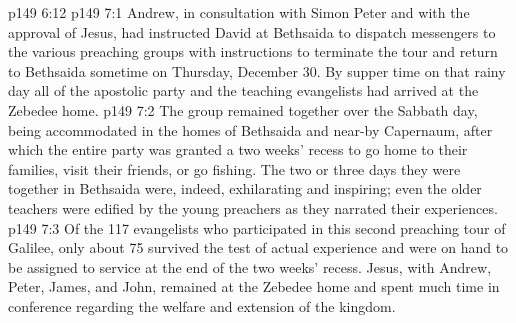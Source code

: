 \vs p149 6:12 
\vs p149 7:1 Andrew, in consultation with Simon Peter and with the approval of Jesus, had instructed David at Bethsaida to dispatch messengers to the various preaching groups with instructions to terminate the tour and return to Bethsaida sometime on Thursday, December 30. By supper time on that rainy day all of the apostolic party and the teaching evangelists had arrived at the Zebedee home.
\vs p149 7:2 The group remained together over the Sabbath day, being accommodated in the homes of Bethsaida and near-by Capernaum, after which the entire party was granted a two weeks’ recess to go home to their families, visit their friends, or go fishing. The two or three days they were together in Bethsaida were, indeed, exhilarating and inspiring; even the older teachers were edified by the young preachers as they narrated their experiences.
\vs p149 7:3 Of the 117 evangelists who participated in this second preaching tour of Galilee, only about 75 survived the test of actual experience and were on hand to be assigned to service at the end of the two weeks’ recess. Jesus, with Andrew, Peter, James, and John, remained at the Zebedee home and spent much time in conference regarding the welfare and extension of the kingdom.
\quizlink
